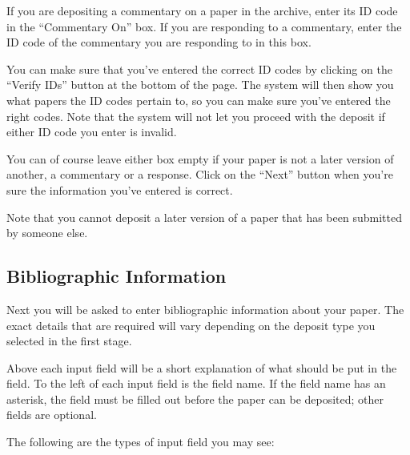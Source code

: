 If you are depositing a commentary on a paper in the archive, enter its ID code in the ``Commentary On'' box. If you are responding to a commentary, enter the ID code of the commentary you are responding to in this box.

You can make sure that you've entered the correct ID codes by clicking on the ``Verify IDs'' button at the bottom of the page. The system will then show you what papers the ID codes pertain to, so you can make sure you've entered the right codes. Note that the system will not let you proceed with the deposit if either ID code you enter is invalid.

You can of course leave either box empty if your paper is not a later version of another, a commentary or a response. Click on the ``Next'' button when you're sure the information you've entered is correct.

Note that you cannot deposit a later version of a paper that has been submitted by someone else.


\subsection{Bibliographic Information}

Next you will be asked to enter bibliographic information about your paper. The exact details that are required will vary depending on the deposit type you selected in the first stage.

Above each input field will be a short explanation of what should be put in the field. To the left of each input field is the field name. If the field name has an asterisk, the field must be filled out before the paper can be deposited; other fields are optional.

The following are the types of input field you may see:

